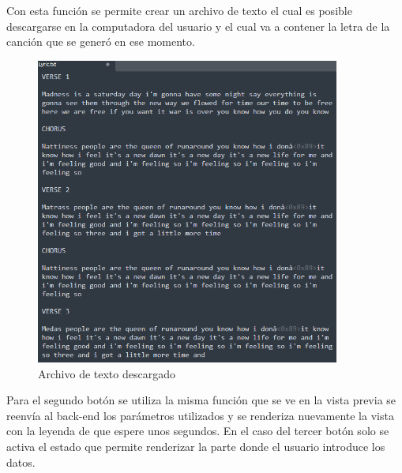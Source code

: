 \documentclass[12pt, a4paper, titlepage]{article}
\begin{document}
	Con esta función se permite crear un archivo de texto el cual es posible descargarse en la computadora del usuario y el cual va a contener la letra de la canción que se generó en ese momento.
	\begin{figure}[H]
		\includegraphics[width=10cm]{./Imagenes/AplicacionWeb/Archivo.png}
		\centering 
		\caption{Archivo de texto descargado}
	\end{figure}	
	Para el segundo botón se utiliza la misma función que se ve en la vista previa se reenvía al back-end los parámetros utilizados y se renderiza nuevamente la vista con la leyenda de que espere unos segundos. En el caso del tercer botón solo se activa el estado que permite renderizar la parte donde el usuario introduce los datos.
	\newpage
\end{document}
